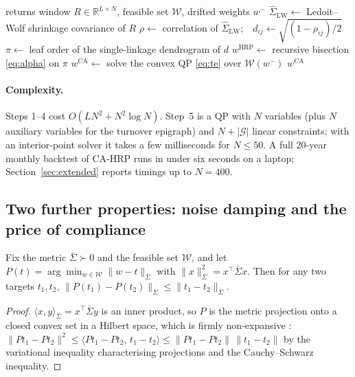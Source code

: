 \begin{algorithm}[t]
\caption{Constraint-Aware HRP (one rebalancing date)}\label{alg:cahrp}
\begin{algorithmic}[1]
\Require returns window $R\in\mathbb{R}^{L\times N}$, feasible set $\mathcal{W}$, drifted weights $w^-$
\State $\hat\Sigma_{\mathrm{LW}}\gets$ Ledoit--Wolf shrinkage covariance of $R$
\State $\rho\gets$ correlation of $\hat\Sigma_{\mathrm{LW}}$;\ \ $d_{ij}\gets\sqrt{(1-\rho_{ij})/2}$
\State $\pi\gets$ leaf order of the single-linkage dendrogram of $d$
\State $w^{\mathrm{HRP}}\gets$ recursive bisection \eqref{eq:alpha} on $\pi$
\State $w^{\mathrm{CA}}\gets$ solve the convex QP \eqref{eq:te} over $\mathcal{W}(w^-)$
\State \Return $w^{\mathrm{CA}}$
\end{algorithmic}
\end{algorithm}

\paragraph{Complexity.} Steps 1--4 cost $O(LN^2+N^2\log N)$. Step~5 is a QP with $N$
variables (plus $N$ auxiliary variables for the turnover epigraph) and $N+|\mathcal{G}|$
linear constraints; with an interior-point solver \citep{diamond2016} it takes a few
milliseconds for $N\le 50$. A full 20-year monthly backtest of CA-HRP runs in under
six seconds on a laptop; Section~\ref{sec:extended} reports timings up to $N=400$.

\subsection{Two further properties: noise damping and the price of compliance}
\label{sec:props}

\begin{proposition}\label{prop:nonexp}
Fix the metric $\bar\Sigma\succ0$ and the feasible set $\mathcal{W}$, and let
$P(t)=\arg\min_{w\in\mathcal{W}}\lVert w-t\rVert_{\bar\Sigma}$ with
$\lVert x\rVert_{\bar\Sigma}^2=x^\top\bar\Sigma x$. Then for any two targets $t_1,t_2$,
$\lVert P(t_1)-P(t_2)\rVert_{\bar\Sigma}\le\lVert t_1-t_2\rVert_{\bar\Sigma}$.
\end{proposition}
\begin{proof}
$\langle x,y\rangle_{\bar\Sigma}=x^\top\bar\Sigma y$ is an inner product, so $P$ is the
metric projection onto a closed convex set in a Hilbert space, which is firmly
non-expansive \citep{bauschke2017}: $\lVert P t_1-Pt_2\rVert^2\le\langle Pt_1-Pt_2,\,t_1-t_2\rangle\le
\lVert Pt_1-Pt_2\rVert\,\lVert t_1-t_2\rVert$ by the variational inequality characterising
projections and the Cauchy--Schwarz inequality.
\end{proof}

